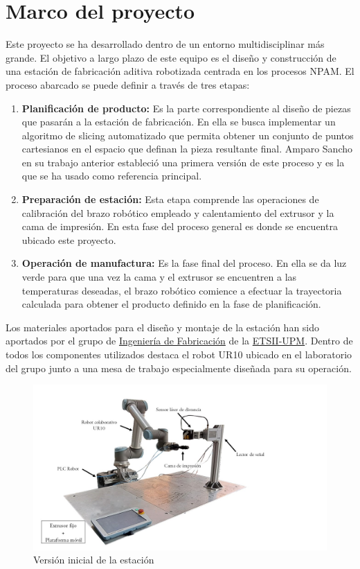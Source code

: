 \section{Marco del proyecto} \label{section:  marco del proyecto}
Este proyecto se ha desarrollado dentro de un entorno multidisciplinar más grande. El objetivo a largo plazo de este equipo es el diseño y construcción de una estación de fabricación aditiva robotizada centrada en los procesos \acrshort{NPAM}. El proceso abarcado se puede definir a través de tres etapas:
\begin{enumerate}
    \item \textbf{Planificación de producto:} Es la parte correspondiente al diseño de piezas que pasarán a la estación de fabricación. En ella se busca implementar un algoritmo de slicing automatizado \cite{paper_Q1_Alvaro_Adrian} que permita obtener un conjunto de puntos cartesianos en el espacio que definan la pieza resultante final. Amparo Sancho en su trabajo anterior \cite{TFM_SanchoAmparo} estableció una primera versión de este proceso y es la que se ha usado como referencia principal.
    \item \textbf{Preparación de estación:} Esta etapa comprende las operaciones de calibración del brazo robótico empleado y calentamiento del extrusor y la cama de impresión. En esta fase del proceso general es donde se encuentra ubicado este proyecto.
    \item \textbf{Operación de manufactura:} Es la fase final del proceso. En ella se da luz verde para que una vez la cama y el extrusor se encuentren a las temperaturas deseadas, el brazo robótico comience a efectuar la trayectoria calculada para obtener el producto definido en la fase de planificación.
\end{enumerate}

Los materiales aportados para el diseño y montaje de la estación han sido aportados por el grupo de \href{https://fabricacion.industriales.upm.es/}{Ingeniería de Fabricación} de la \href{https://www.industriales.upm.es/}{ETSII-UPM}. Dentro de todos los componentes utilizados destaca el robot UR10 ubicado en el laboratorio del grupo junto a una mesa de trabajo especialmente diseñada para su operación.

\begin{figure}[h!]
    \centering
    \includegraphics[scale=0.30]{figuras/estacion_NPAM_sin_estruxor.JPG}
    \caption{Versión inicial de la estación}
    \label{fig: estacion_NPAM_sin_estruxor}
\end{figure}

